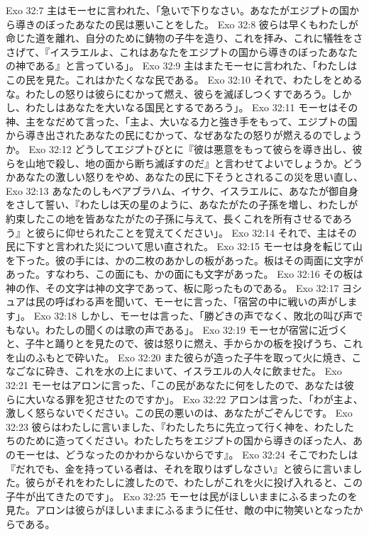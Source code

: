 Exo 32:7  主はモーセに言われた、「急いで下りなさい。あなたがエジプトの国から導きのぼったあなたの民は悪いことをした。
Exo 32:8  彼らは早くもわたしが命じた道を離れ、自分のために鋳物の子牛を造り、これを拝み、これに犠牲をささげて、『イスラエルよ、これはあなたをエジプトの国から導きのぼったあなたの神である』と言っている」。
Exo 32:9  主はまたモーセに言われた、「わたしはこの民を見た。これはかたくなな民である。
Exo 32:10  それで、わたしをとめるな。わたしの怒りは彼らにむかって燃え、彼らを滅ぼしつくすであろう。しかし、わたしはあなたを大いなる国民とするであろう」。
Exo 32:11  モーセはその神、主をなだめて言った、「主よ、大いなる力と強き手をもって、エジプトの国から導き出されたあなたの民にむかって、なぜあなたの怒りが燃えるのでしょうか。
Exo 32:12  どうしてエジプトびとに『彼は悪意をもって彼らを導き出し、彼らを山地で殺し、地の面から断ち滅ぼすのだ』と言わせてよいでしょうか。どうかあなたの激しい怒りをやめ、あなたの民に下そうとされるこの災を思い直し、
Exo 32:13  あなたのしもべアブラハム、イサク、イスラエルに、あなたが御自身をさして誓い、『わたしは天の星のように、あなたがたの子孫を増し、わたしが約束したこの地を皆あなたがたの子孫に与えて、長くこれを所有させるであろう』と彼らに仰せられたことを覚えてください」。
Exo 32:14  それで、主はその民に下すと言われた災について思い直された。
Exo 32:15  モーセは身を転じて山を下った。彼の手には、かの二枚のあかしの板があった。板はその両面に文字があった。すなわち、この面にも、かの面にも文字があった。
Exo 32:16  その板は神の作、その文字は神の文字であって、板に彫ったものである。
Exo 32:17  ヨシュアは民の呼ばわる声を聞いて、モーセに言った、「宿営の中に戦いの声がします」。
Exo 32:18  しかし、モーセは言った、「勝どきの声でなく、敗北の叫び声でもない。わたしの聞くのは歌の声である」。
Exo 32:19  モーセが宿営に近づくと、子牛と踊りとを見たので、彼は怒りに燃え、手からかの板を投げうち、これを山のふもとで砕いた。
Exo 32:20  また彼らが造った子牛を取って火に焼き、こなごなに砕き、これを水の上にまいて、イスラエルの人々に飲ませた。
Exo 32:21  モーセはアロンに言った、「この民があなたに何をしたので、あなたは彼らに大いなる罪を犯させたのですか」。
Exo 32:22  アロンは言った、「わが主よ、激しく怒らないでください。この民の悪いのは、あなたがごぞんじです。
Exo 32:23  彼らはわたしに言いました、『わたしたちに先立って行く神を、わたしたちのために造ってください。わたしたちをエジプトの国から導きのぼった人、あのモーセは、どうなったのかわからないからです』。
Exo 32:24  そこでわたしは『だれでも、金を持っている者は、それを取りはずしなさい』と彼らに言いました。彼らがそれをわたしに渡したので、わたしがこれを火に投げ入れると、この子牛が出てきたのです」。
Exo 32:25  モーセは民がほしいままにふるまったのを見た。アロンは彼らがほしいままにふるまうに任せ、敵の中に物笑いとなったからである。
